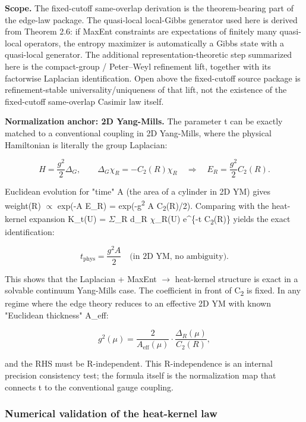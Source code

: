 \textbf{Scope.} The fixed-cutoff same-overlap derivation is the theorem-bearing part of the
edge-law package. The quasi-local local-Gibbs generator used here is derived from Theorem 2.6:
if MaxEnt constraints are expectations of finitely many quasi-local operators, the entropy
maximizer is automatically a Gibbs state with a quasi-local generator. The additional
representation-theoretic step summarized here is the compact-group / Peter--Weyl refinement
lift, together with its factorwise Laplacian identification. Open above the
fixed-cutoff source package is refinement-stable universality/uniqueness of that lift, not the
existence of the fixed-cutoff same-overlap Casimir law itself.

\textbf{Normalization anchor: 2D Yang-Mills.} The parameter t can be exactly matched to a conventional coupling in 2D Yang-Mills, where the physical Hamiltonian is literally the group Laplacian:

\[
H = \frac{g^2}{2} \Delta_G, \qquad
\Delta_G \chi_R = -C_2(R) \chi_R
\quad \Rightarrow \quad
E_R = \frac{g^2}{2} C_2(R).
\]

Euclidean evolution for "time" A (the area of a cylinder in 2D YM) gives weight(R) \ensuremath{\propto} exp(-A E\_R) = exp(-g\textsuperscript{2} A C\textsubscript{2}(R)/2). Comparing with the heat-kernel expansion K\_t(U) = \ensuremath{\Sigma}\_R d\_R \ensuremath{\chi}\_R(U) e\^{}\{-t C\textsubscript{2}(R)\} yields the exact identification:

\[
t_\mathrm{phys} = \frac{g^2 A}{2} \quad \text{(in 2D YM, no ambiguity).}
\]

This shows that the Laplacian + MaxEnt \ensuremath{\to} heat-kernel structure is exact in a solvable continuum Yang-Mills case. The coefficient in front of C\textsubscript{2} is fixed. In any regime where the edge theory reduces to an effective 2D YM with known "Euclidean thickness" A\_eff:

\[
g^2(\mu) = \frac{2}{A_\mathrm{eff}(\mu)} \cdot \frac{\Delta_R(\mu)}{C_2(R)},
\]

and the RHS must be R-independent. This R-independence is an internal precision consistency test; the formula itself is the normalization map that connects t to the conventional gauge coupling.

\subsubsection{Numerical validation of the heat-kernel law}\label{614-numerical-validation-of-the-heat-kernel-law}

